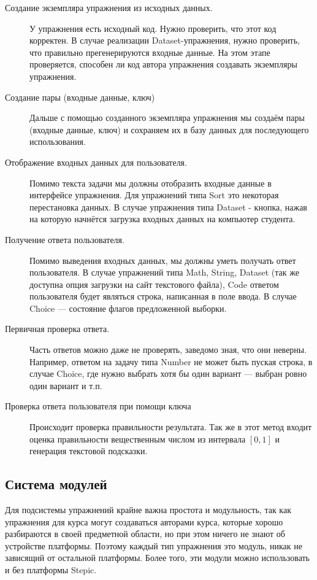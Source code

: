 \documentclass{matmex-diploma-custom}
\begin{document}
\begin{description}
\item[Создание экземпляра упражнения из исходных данных.]

  У упражнения есть исходный код. Нужно проверить, что этот код
  корректен. В случае реализации Dataset-упражнения, нужно проверить,
  что правильно прегенерируются входные данные. На этом этапе
  проверяется, способен ли код автора упражнения создавать экземпляры
  упражнения.

\item[Создание пары (входные данные, ключ)]

  Дальше с помощью созданного экземпляра упражнения мы создаём пары
  (входные данные, ключ) и сохраняем их в базу данных для последующего
  использования.

\item[Отображение входных данных для пользователя.]

  Помимо текста задачи мы должны отобразить входные данные в
  интерфейсе упражнения. Для упражнений типа Sort это некоторая
  перестановка данных. В случае упражнения типа Dataset - кнопка,
  нажав на которую начнётся загрузка входных данных на компьютер
  студента.

\item[Получение ответа пользователя.]

  Помимо выведения входных данных, мы должны уметь получать ответ
  пользователя. В случае упражнений типа Math, String, Dataset (так же
  доступна опция загрузки на сайт текстового файла), Code ответом
  пользователя будет являться строка, написанная в поле ввода. В
  случае Choice --- состояние флагов предложенной выборки.

\item[Первичная проверка ответа.]

  Часть ответов можно даже не проверять, заведомо зная, что они
  неверны. Например, ответом на задачу типа Number не может быть
  пуская строка, в случае Choice, где нужно выбрать хотя бы один
  вариант --- выбран ровно один вариант и т.п.

\item[Проверка ответа пользователя при помощи ключа]

  Происходит проверка правильности результата. Так же в этот метод
  входит оценка правильности вещественным числом из интервала $[0, 1]$
  и генерация текстовой подсказки.
\end{description}

\subsection{Система модулей}
Для подсистемы упражнений крайне важна простота и модульность, так как
упражнения для курса могут создаваться авторами курса, которые хорошо
разбираются в своей предметной области, но при этом ничего не знают об
устройстве платформы. Поэтому каждый тип упражнения это модуль, никак
не зависящий от остальной платформы. Более того, эти модули можно
использовать и без платформы Stepic.
\end{document}
